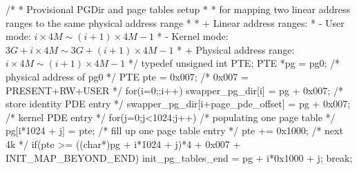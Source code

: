 \documentclass[varwidth=37.2em,crop]{standalone}
\begin{document}
\begin{ccode}
/*
 * Provisional PGDir and page tables setup
 * 
 * for mapping two linear address ranges to the same physical address range
 *
 *  + Linear address ranges:
 *             -   User mode: $i\times{}4M\sim{}(i+1)\times{}4M-1$
 *             - Kernel mode: $3G+i\times{}4M\sim{}3G+(i+1)\times{}4M-1$
 *  + Physical address range: $i\times{}4M\sim{}(i+1)\times{}4M-1$
 */
typedef unsigned int PTE;
PTE *pg = pg0;     /* physical address of pg0 */
PTE pte = 0x007;   /* 0x007 = PRESENT+RW+USER */
for(i=0;;i++){
  swapper_pg_dir[i] = pg + 0x007;         /* store identity PDE entry */
  swapper_pg_dir[i+page_pde_offset] = pg + 0x007; /* kernel PDE entry */
  for(j=0;j<1024;j++){               /* populating one page table */
    pg[i*1024 + j] = pte;            /* fill up one page table entry */
    pte += 0x1000;                   /* next 4k */
  }
  if(pte >= ((char*)pg + i*1024 + j)*4 + 0x007 + INIT_MAP_BEYOND_END)
    {
      init_pg_tables_end = pg + i*0x1000 + j;
      break;
    }
  }  
\end{ccode}
\end{document}
